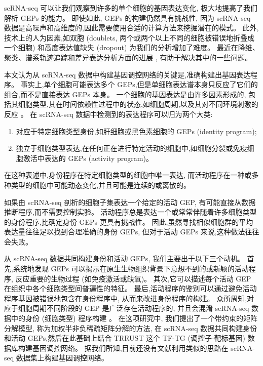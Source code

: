 scRNA-seq 可以让我们观察到许多的单个细胞的基因表达变化,
极大地提高了我们解析 GEPs 的能力。
即使如此, GEPs 的构建仍然具有挑战性,
因为 scRNA-seq 数据是高噪声和高维度的,因此需要使用合适的计算方法来挖掘潜在的模式。
此外,技术上的人为因素,如双胞 (doublets, 两个或两个以上不同的细胞被错误地折叠成一个细胞) 和高度表达值缺失 (dropout) 为我们的分析增加了难度。
最近在降维、聚类、谱系轨迹追踪和差异表达分析方面的进展 ,
有助于解决其中的一些问题。

本文认为从 scRNA-seq 数据中构建基因调控网络的关键是,准确构建出基因表达程序。
事实上,单个细胞可能表达多个 GEPs,但是单细胞表达谱本身只反应了它们的组合,而不是直接表达 GEPs 本身。
一个细胞的基因表达是由许多因素形成的,
包括其细胞类型,其在时间依赖性过程中的状态,如细胞周期,以及其对不同环境刺激的反应 。
在 scRNA-seq 数据中检测到的表达程序可以归为两个大类:
\begin{enumerate}[label=(\arabic*),itemindent=2em]
    \item 对应于特定细胞类型身份,如肝细胞或黑色素细胞的 GEPs (identity program);
    \item 独立于细胞类型表达,在任何正在进行特定活动的细胞中,如细胞分裂或免疫细胞激活中表达的 GEPs (activity program)。
\end{enumerate}
在这种表述中,身份程序在特定细胞类型的细胞中唯一表达,
而活动程序在一种或多种类型的细胞中可能动态变化,并且可能是连续的或离散的。

如果由 scRNA-seq 剖析的细胞子集表达一个给定的活动 GEP,
有可能直接从数据推断程序,而不需要控制实验。
活动程序总是表达一个或常常伴随着许多细胞类型的身份程序,比确定身份 GEPs 更具有挑战性。
因此,虽然寻找相似细胞群的平均表达量往往足以找到合理准确的身份 GEPs,
但对于活动 GEPs 来说,这种做法往往会失败。

从 scRNA-seq 数据共同构建身份和活动 GEPs, 我们主要出于以下三个动机。
首先,系统地发现 GEPs 可以揭示在原生生物组织背景下意想不到的或新颖的活动程序,
反应重要的生物过程 (如免疫激活或缺氧)。
其次,它可以描述每个活动 GEP 在组织中各个细胞类型间普遍性的特征。
最后,活动程序的鉴别可以通过避免活动程序基因被错误地包含在身份程序中, 从而来改进身份程序的构建。
众所周知,对应于细胞周期不同阶段的 GEP 是广泛存在活动程序的,
并且会混淆 scRNA-seq 数据中的身份 (细胞类型) 程序构建 。
在这项研究中, 我们提出了一个带约束的矩阵分解模型, 称为加权半非负稀疏矩阵分解的方法,
在 scRNA-seq 数据共同构建身份和活动 GEPs,然后在此基础上结合 TRRUST 这个 TF-TG (调控子-靶标基因) 数据库构建基因调控网络。
据我们所知,目前还没有文献利用类似的思路在 scRNA-seq 数据集上构建基因调控网络。


